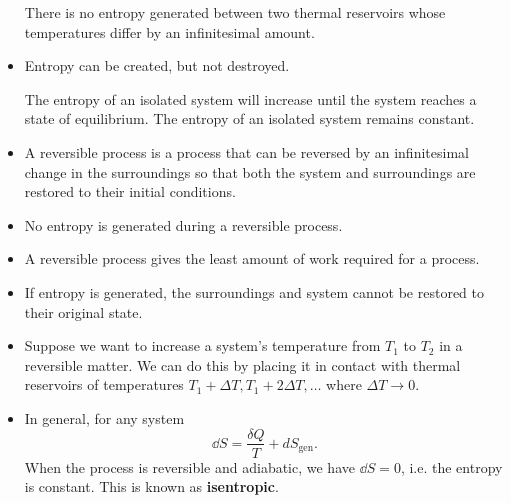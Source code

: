 \begin{itemize}
    \begin{idea}
        There is no entropy generated between two thermal reservoirs whose temperatures differ by an infinitesimal amount.
    \end{idea}
    \item Entropy can be created, but not destroyed.
    \begin{theorem}
        The entropy of an isolated system will increase until the system reaches a state of equilibrium. The entropy of an isolated system remains constant.
    \end{theorem}
    \item A reversible process is a process that can be reversed by an infinitesimal change in the surroundings so that both the system and surroundings are restored to their initial conditions.
    \item No entropy is generated during a reversible process.
    \item A reversible process gives the least amount of work required for a process.
    \item If entropy is generated, the surroundings and system cannot be restored to their original state.
    \item Suppose we want to increase a system's temperature from $T_1$ to $T_2$ in a reversible matter. We can do this by placing it in contact with thermal reservoirs of temperatures $T_1+\Delta T,T_1+2\Delta T,\dots$ where $\Delta T \rightarrow 0$.
    \item In general, for any system 
    \begin{equation}
        \dd{S} = \frac{\delta Q}{T} + dS_\text{gen}.
    \end{equation}
    When the process is reversible and adiabatic, we have $\dd{S}=0$, i.e. the entropy is constant. This is known as \textbf{isentropic}.
\end{itemize}